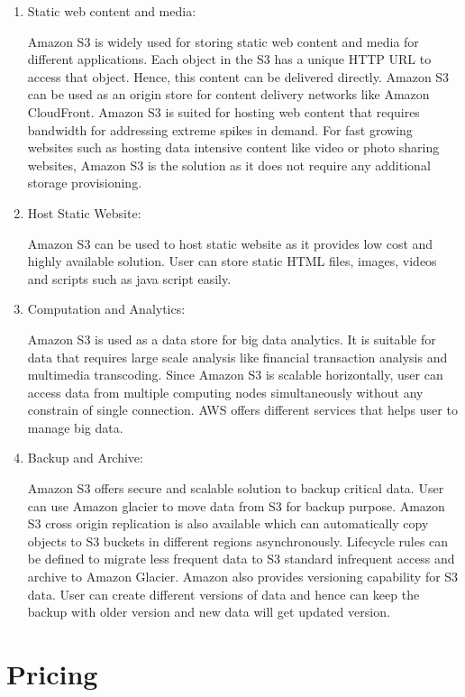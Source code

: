 \begin{enumerate}
\item Static web content and media:

Amazon S3 is widely used for storing static web content and media for different
applications. Each object in the S3 has a
unique HTTP URL to access that object. Hence, this content can be delivered
directly. Amazon S3 can be
used as an origin store for content delivery networks like Amazon CloudFront.
Amazon S3 is suited for hosting web content that requires bandwidth for
addressing extreme spikes in demand. For fast growing websites such as hosting
data intensive content like video or photo sharing websites, Amazon S3 is the
solution as it does not require any additional storage provisioning.
 
\item Host Static Website:

Amazon S3 can be used to host static website as it
provides low cost and highly available solution. User can store static HTML
files, images, videos and scripts such as java script easily.

\item Computation and Analytics:

Amazon S3 is used as a data store for big data analytics. It is suitable for
data that requires large scale analysis like
financial transaction analysis and multimedia transcoding. Since Amazon S3 is
scalable horizontally, user can access data from multiple computing nodes
simultaneously without any constrain of single connection. AWS offers different
services that helps user to manage big data.

\item Backup and Archive:

Amazon S3 offers secure and scalable solution to
backup critical data. User can use Amazon glacier to move data from S3 for
backup purpose. Amazon S3 cross origin replication is also available which can
automatically copy objects to S3 buckets in different regions asynchronously.
Lifecycle rules can be defined to migrate less frequent data to S3 standard 
infrequent access and archive to Amazon Glacier. Amazon also provides
versioning capability for S3 data. User can create different versions of data
and hence can keep the backup with older version and new data will get updated
version.

\end{enumerate}

\section{Pricing}

